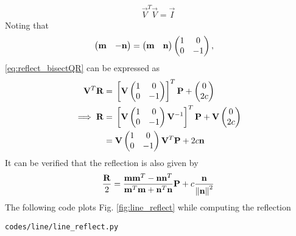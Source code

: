 \documentclass[journal,12pt,twocolumn]{IEEEtran}
\renewcommand\thesection{\arabic{section}}
\begin{document}
\begin{enumerate}[label=\thesection.\arabic*.,ref=\thesection.\theenumi]
\begin{align}
\label{eq:reflect_ortho}
\vec{V}^T\vec{V}=  \vec{I}
\end{align}
%
Noting that 
\begin{align}
\label{eq:reflect_trans}
\begin{pmatrix}\mathbf{m} & -\mathbf{n}\end{pmatrix} &= \begin{pmatrix}\mathbf{m} & \mathbf{n}\end{pmatrix} \begin{pmatrix}1 & 0 \\ 0 & -1\end{pmatrix},
\end{align}
\eqref{eq:reflect_bisectQR} can be expressed as
%
\begin{align}
\label{eq:reflect_}
\mathbf{V}^T\mathbf{R} &=  {}\left[\mathbf{V}\begin{pmatrix}1 & 0 \\ 0 & -1\end{pmatrix}\right]^T\mathbf{P}+\begin{pmatrix}0 \\ 2c\end{pmatrix}
\\
\implies \mathbf{R} &= {}\left[\mathbf{V}\begin{pmatrix}1 & 0 \\ 0 & -1\end{pmatrix}\mathbf{V}^{-1}\right]^T\mathbf{P}+ \mathbf{V}\begin{pmatrix}0 \\ 2c\end{pmatrix}
\\
 &=\mathbf{V}\begin{pmatrix}1 & 0 \\ 0 & -1\end{pmatrix}\mathbf{V}^T \mathbf{P}+2c \mathbf{n}
\end{align}
It can be verified that 
the reflection is also given by
\begin{align}
\frac{\mathbf{R}}{2} = \frac{\mathbf{m}\mathbf{m}^T-\mathbf{n}\mathbf{n}^T}{\mathbf{m}^T\mathbf{m}+\mathbf{n}^T\mathbf{n}}\mathbf{P} + c 
\frac{\mathbf{n}}{\left\lVert\mathbf{n}\right\rVert^2}
\end{align}
%
The following code plots Fig. \ref{fig:line_reflect} while computing the reflection
%
\begin{lstlisting}
codes/line/line_reflect.py
\end{lstlisting}
%
%


\end{enumerate}
\end{document}
